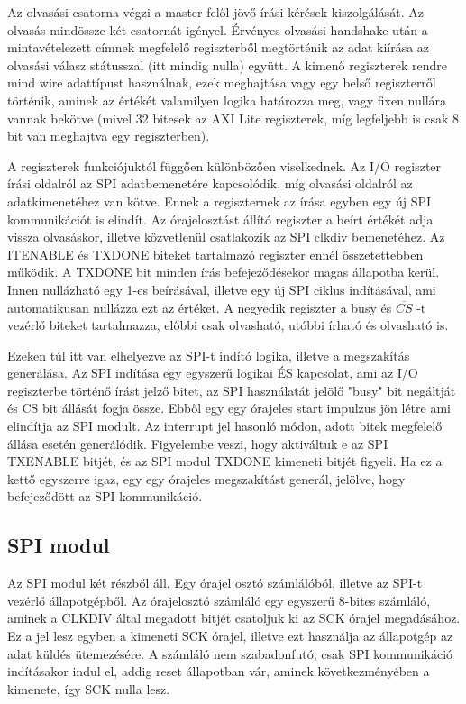 \documentclass[a4paper,11pt]{article}
\begin{document}
Az olvasási csatorna végzi a master felől jövő írási kérések kiszolgálását. Az olvasás mindössze két csatornát igényel. Érvényes olvasási handshake után a mintavételezett címnek megfelelő regiszterből megtörténik az adat kiírása az olvasási válasz státusszal (itt mindig nulla) együtt. A kimenő regiszterek rendre mind wire adattípust használnak, ezek meghajtása vagy egy belső regiszterről történik, aminek az értékét valamilyen logika határozza meg, vagy fixen nullára vannak bekötve (mivel 32 bitesek az AXI Lite regiszterek, míg legfeljebb is csak 8 bit van meghajtva egy regiszterben).

A regiszterek funkciójuktól függően különbözően viselkednek. Az I/O regiszter írási oldalról az SPI adatbemenetére kapcsolódik, míg olvasási oldalról az adatkimenetéhez van kötve. Ennek a regiszternek az írása egyben egy új SPI kommunikációt is elindít. Az órajelosztást állító regiszter a beírt értékét adja vissza olvasáskor, illetve közvetlenül csatlakozik az SPI clkdiv bemenetéhez. Az ITENABLE és TXDONE biteket tartalmazó regiszter ennél összetettebben működik. A TXDONE bit minden írás befejeződésekor magas állapotba kerül. Innen nullázható egy 1-es beírásával, illetve egy új SPI ciklus indításával, ami automatikusan nullázza ezt az értéket. A negyedik regiszter a busy és $\overline{CS}$ -t vezérlő biteket tartalmazza, előbbi csak olvasható, utóbbi írható és olvasható is.

Ezeken túl itt van elhelyezve az SPI-t indító logika, illetve a megszakítás generálása. Az SPI indítása egy egyszerű logikai ÉS kapcsolat, ami az I/O regiszterbe történő írást jelző bitet, az SPI használatát jelölő "busy" bit negáltját és CS bit állását fogja össze. Ebből egy egy órajeles start impulzus jön létre ami elindítja az SPI modult. Az interrupt jel hasonló módon, adott bitek megfelelő állása esetén generálódik. Figyelembe veszi, hogy aktiváltuk e az SPI TX\textunderscore ENABLE bitjét, és az SPI modul TXDONE kimeneti bitjét figyeli. Ha ez a kettő egyszerre igaz, egy egy órajeles megszakítást generál, jelölve, hogy befejeződött az SPI kommunikáció.

\subsection{SPI modul}

Az SPI modul két részből áll. Egy órajel osztó számlálóból, illetve az SPI-t vezérlő állapotgépből. Az órajelosztó számláló egy egyszerű 8-bites számláló, aminek a CLKDIV által megadott bitjét csatoljuk ki az SCK órajel megadásához. Ez a jel lesz egyben a kimeneti SCK órajel, illetve ezt használja az állapotgép az adat küldés ütemezésére. A számláló nem szabadonfutó, csak SPI kommunikáció indításakor indul el, addig reset állapotban vár, aminek következményében a kimenete, így SCK nulla lesz.
\end{document}
